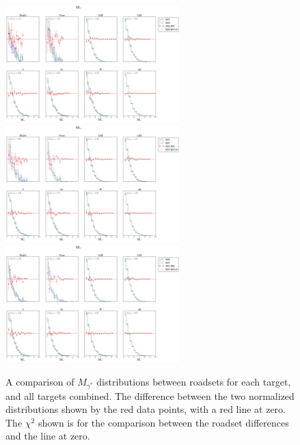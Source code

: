 \begin{figure}
	\centering
	\includegraphics[width=0.6\textwidth]{figures/analysis/R57_R62_compare_mass.png}\vspace{5pt} \\
	\includegraphics[width=0.6\textwidth]{figures/analysis/R57_R67_compare_mass.png} \vspace{5pt} \\
	\includegraphics[width=0.6\textwidth]{figures/analysis/R62_R67_compare_mass.png}
	\caption{A comparison of $M_{\gamma^*}$ distributions between roadsets for each target, and all targets combined. The difference between the two normalized distributions shown by the red data points, with a red line at zero. The $\chi^2$ shown is for the comparison between the roadset differences and the line at zero.}
	\label{fig:roadset-mass-compare}
\end{figure}

